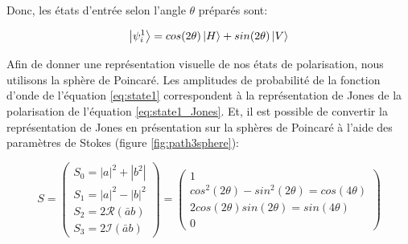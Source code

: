 \begin{onehalfspace}
    \noindent Donc, les états d'entrée selon l'angle $\theta$ préparés sont:
\end{onehalfspace}

\begin{equation}
    \ket{\psi_{i}^{1}} = cos(2\theta)\ket{H} + sin(2\theta)\ket{V}
    \label{eq:state1}
\end{equation}

\begin{onehalfspace}
    \noindent Afin de donner une représentation visuelle de nos états de 
    polarisation, nous utilisons la sphère de Poincaré. Les amplitudes de probabilité
    de la fonction d'onde de l'équation \ref{eq:state1} correspondent à la 
    représentation de Jones de la polarisation de l'équation \ref{eq:state1_Jones}. Et, il est possible de 
    convertir la représentation de Jones en présentation sur la sphères 
    de Poincaré à l'aide des paramètres de Stokes (figure \ref{fig:path3sphere}):
\end{onehalfspace}

\begin{equation}
    S = \begin{pmatrix}
        S_0 = |a|^2 + |b^2|\\
        S_1 = |a|^2 - |b|^2\\
        S_2 = 2\mathcal{R}(\bar{a}b)\\
        S_3 = 2\mathcal{I}(\bar{a}b)
    \end{pmatrix} = \begin{pmatrix}
        1\\
        cos^{2}(2\theta) - sin^{2}(2\theta) = cos(4\theta)\\
        2cos(2\theta)sin(2\theta) = sin(4\theta)\\
        0
    \end{pmatrix}
\end{equation}

